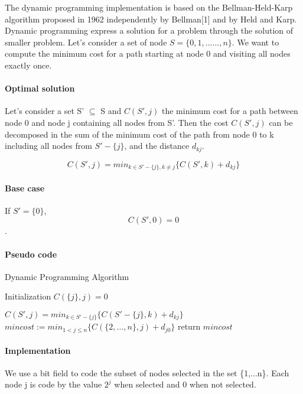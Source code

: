 \documentclass[../report.tex]{subfiles}
\begin{document}
The dynamic programming implementation is based on the Bellman-Held-Karp algorithm  proposed in 1962 independently by Bellman[1] and by Held and Karp.
\newline{}
Dynamic programming express a solution for a problem through the solution of smaller problem.
\newline{}
Let's consider a set of node $S=\{0,1,......,n\}$. We want to compute the minimum cost for a path starting at node 0 and visiting all nodes exactly once.
\newline{}
\paragraph{Optimal solution}\hfill \break
Let's consider a set S' $\subseteq$ S and $C(S',j)$ the minimum cost for a path between node 0 and node j containing all nodes from S'. Then the cost $C(S',j)$ can be decomposed in the sum of the minimum cost of the path from node 0 to k including all nodes from $S'-\{j\}$, and the distance $d_{kj}$.

$$C(S',j)=min_{k \in S'-\{j\}, k \ne j}\{C(S',k)+d_{kj}\}$$

\paragraph{Base case}\hfill \break
If $S'=\{0\}$, $$C(S',0)=0$$.

\paragraph{Pseudo code}\hfill

\begin{algorithm}
\caption{Dynamic Programming Algorithm}
\begin{algorithmic} 
\STATE Initialization
\STATE $C(\{j\},j)=0$
\ENDFOR

         \STATE $C(S',j)=min_{k \in S'-\{j\}}\{C(S'-\{j\},k)+d_{kj}\}$
      \ENDFOR
   \ENDFOR
\ENDFOR
\STATE $mincost := min_{1<j \leq n}\{C(\{2,...,n\},j)+d_{j0}\}$
\STATE return $mincost$
\end{algorithmic}
\end{algorithm}


\paragraph{Implementation}\hfill \break
We use a bit field to code the subset of nodes selected in the set \{1,...n\}.
Each node j is code by the value $2^j$ when selected and 0 when not selected. 
\end{document}
